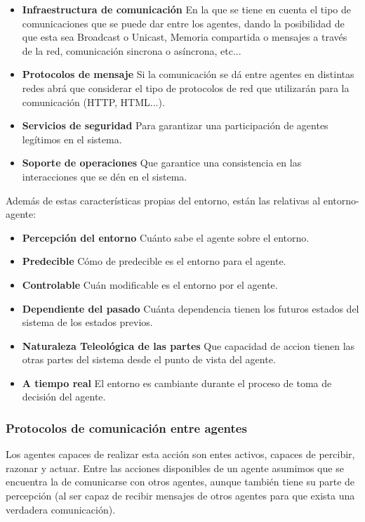 \begin{itemize}
	\item\textbf{Infraestructura de comunicación} En la que se tiene en cuenta el tipo de comunicaciones que se puede dar entre los agentes, dando la posibilidad de que esta sea Broadcast o Unicast, Memoria compartida o mensajes a través de la red, comunicación sincrona o asíncrona, etc...
	\item\textbf{Protocolos de mensaje} Si la comunicación se dá entre agentes en distintas redes abrá que considerar el tipo de protocolos de red que utilizarán para la comunicación (HTTP, HTML...).
	\item\textbf{Servicios de seguridad} Para garantizar una participación de agentes legítimos en el sistema.
	\item\textbf{Soporte de operaciones} Que garantice una consistencia en las interacciones que se dén en el sistema.
\end{itemize}

Además de estas características propias del entorno, están las relativas al entorno-agente:

\begin{itemize}
	\item\textbf{Percepción del entorno} Cuánto sabe el agente sobre el entorno.
	\item\textbf{Predecible} Cómo de predecible es el entorno para el agente.
	\item\textbf{Controlable} Cuán modificable es el entorno por el agente.
	\item\textbf{Dependiente del pasado} Cuánta dependencia tienen los futuros estados del sistema de los estados previos.
	\item\textbf{Naturaleza Teleológica de las partes} Que capacidad de accion tienen las otras partes del sistema desde el punto de vista del agente.
	\item\textbf{A tiempo real} El entorno es cambiante durante el proceso de toma de decisión del agente.
\end{itemize}

\subsubsection{Protocolos de comunicación entre agentes}

Los agentes capaces de realizar esta acción son entes activos, capaces de percibir, razonar y actuar. Entre las acciones disponibles de un agente asumimos que se encuentra la de comunicarse con otros agentes, aunque también tiene su parte de percepción (al ser capaz de recibir mensajes de otros agentes para que exista una verdadera comunicación).


